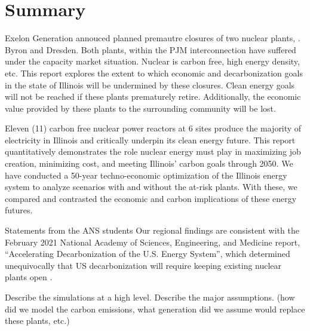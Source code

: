 \section{Summary}

Exelon Generation annouced planned premautre closures of two nuclear plants, .  
Byron and Dresden. 
Both plants, within the PJM interconnection  have suffered 
under the capacity market situation.
Nuclear is carbon free, high energy density, etc.
This report explores the extent to which economic and decarbonization goals in 
the state of Illinois will be undermined by these closures.  
Clean energy goals will not be reached if these plants prematurely retire. 
Additionally, the economic value provided by these plants to the surrounding community will be lost. 

Eleven (11) carbon free nuclear power reactors at 6 sites produce the majority of 
electricity in Illinois and critically underpin its clean energy future. This 
report quantitatively demonstrates the role nuclear energy must play in 
maximizing job creation, minimizing cost, and meeting Illinois’ carbon goals 
through 2050. We have conducted a 50-year techno-economic optimization of 
the Illinois energy system to analyze scenarios with and without the 
at-risk plants. With these, we compared and contrasted the economic and carbon implications of 
these energy futures. 


Statements from the ANS students
Our regional findings are consistent with the February 2021 National Academy of 
Sciences, Engineering, and Medicine report, “Accelerating Decarbonization of 
the U.S. Energy System”, which determined unequivocally that US decarbonization 
will require keeping existing nuclear plants open 
\cite{national_accelerating_2021}.


Describe the simulations at a high level.
Describe the major assumptions.
(how did we model the carbon emissions, what generation did we assume would 
replace these plants, etc.)

